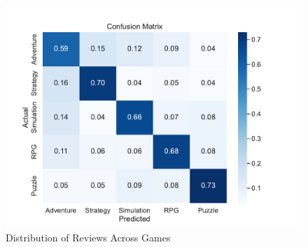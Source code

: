 \begin{figure}[!h]
    \centering
    \includegraphics[width=.9\textwidth]{data/results/plots/mean_confusion_matrix}
    \caption{Distribution of Reviews Across Games}
    \label{fig:conf_mat_plot}
\end{figure}